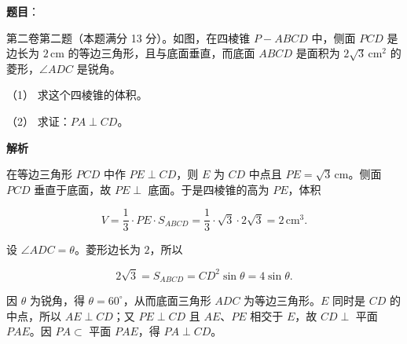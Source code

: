 \begin{answer}

\textbf{题目}：

第二卷第二题（本题满分 13 分）。如图，在四棱锥 $P-ABCD$ 中，侧面 $PCD$ 是边长为 $2\,\mathrm{cm}$ 的等边三角形，且与底面垂直，而底面 $ABCD$ 是面积为 $2\sqrt3\,\mathrm{cm}^2$ 的菱形，$\angle ADC$ 是锐角。
\nopagebreak[4]
\begin{center}\end{center}
\nopagebreak[4]
（1） 求这个四棱锥的体积。

（2） 求证：$PA\perp CD$。

\textbf{解析}


在等边三角形 $PCD$ 中作 $PE\perp CD$，则 $E$ 为 $CD$ 中点且 $PE=\sqrt3\,\mathrm{cm}$。侧面 $PCD$ 垂直于底面，故 $PE\perp$ 底面。于是四棱锥的高为 $PE$，体积

\nopagebreak[4]
\[
V=\frac13\cdot PE\cdot S_{ABCD}
=\frac13\cdot\sqrt3\cdot2\sqrt3=2\,\mathrm{cm}^3.
\]


设 $\angle ADC=\theta$。菱形边长为 $2$，所以

\nopagebreak[4]
\[
2\sqrt3=S_{ABCD}=CD^2\sin\theta=4\sin\theta.
\]

因 $\theta$ 为锐角，得 $\theta=60^\circ$，从而底面三角形 $ADC$ 为等边三角形。$E$ 同时是 $CD$ 的中点，所以 $AE\perp CD$；又 $PE\perp CD$ 且 $AE\text{、}PE$ 相交于 $E$，故 $CD\perp$ 平面 $PAE$。因 $PA\subset$ 平面 $PAE$，得 $PA\perp CD$。



\end{answer}
